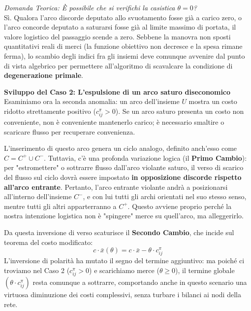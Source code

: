 \documentclass[12pt, a4paper]{article}
\newcommand{\separatore}{\noindent{\color{titlecolor!50}\rule{\textwidth}{0.6pt}}}
\begin{document}
	\textit{Domanda Teorica: È possibile che si verifichi la casistica $\theta = 0$?} \\
	Sì. Qualora l'arco discorde deputato allo svuotamento fosse già a carico zero, o l'arco concorde deputato a saturarsi fosse già al limite massimo di portata, il valore logistico del passaggio scende a zero. Sebbene la manovra non sposti quantitativi reali di merci (la funzione obiettivo non decresce e la spesa rimane ferma), lo scambio degli indici fra gli insiemi deve comunque avvenire dal punto di vista algebrico per permettere all'algoritmo di scavalcare la condizione di \textbf{degenerazione primale}.
	
	\vspace{0.6cm}
	\separatore
	\vspace{0.4cm}
	
	\textbf{Sviluppo del Caso 2: L'espulsione di un arco saturo diseconomico}\\
	Esaminiamo ora la seconda anomalia: un arco dell'insieme $U$ mostra un costo ridotto strettamente positivo ($c^\pi_{ij} > 0$). Se un arco saturo presenta un costo non conveniente, non è conveniente mantenerlo carico; è necessario smaltire o scaricare flusso per recuperare convenienza.
	
	L'inserimento di questo arco genera un ciclo analogo, definito anch'esso come $C = C^+ \cup C^-$. 
	Tuttavia, c'è una profonda variazione logica (il \textbf{Primo Cambio}): per "estromettere" o sottrarre flusso dall'arco violante saturo, il verso di scarico del flusso sul ciclo dovrà essere impostato \textbf{in opposizione discorde rispetto all'arco entrante}. Pertanto, l'arco entrante violante andrà a posizionarsi all'interno dell'insieme $C^-$, e con lui tutti gli archi orientati nel suo stesso senso, mentre tutti gli altri apparterranno a $C^+$. Questo avviene proprio perché la nostra intenzione logistica non è "spingere" merce su quell'arco, ma alleggerirlo.
	
	Da questa inversione di verso scaturisce il \textbf{Secondo Cambio}, che incide sul teorema del costo modificato:
	\[
	c \cdot \bar{x}(\theta) = c \cdot \bar{x} - \theta \cdot c^\pi_{ij}
	\]
	L'inversione di polarità ha mutato il segno del termine aggiuntivo: ma poiché ci troviamo nel Caso 2 ($c^\pi_{ij} > 0$) e scarichiamo merce ($\theta \ge 0$), il termine globale $(\theta \cdot c^\pi_{ij})$ resta comunque a sottrarre, comportando anche in questo scenario una virtuosa diminuzione dei costi complessivi, senza turbare i bilanci ai nodi della rete.
	
\end{document}
